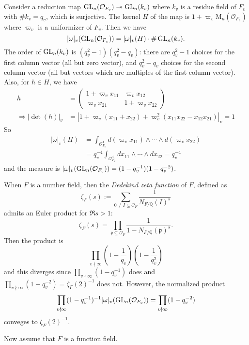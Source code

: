 \begin{problem} \notfinish
Consider a reduction map $\operatorname{\mathrm{GL}}_n(\mathcal{O}_{F_v}) \twoheadrightarrow \operatorname{\mathrm{GL}}_n(k_v)$ where $k_v$ is a residue field of $F_v$ with $\#k_v = q_v$,
which is surjective.
The kernel $H$ of the map is $1 + \varpi_v\mathrm{M}_{n}(\mathcal{O}_{F_v})$ where $\varpi_v$ is a uniformizer of $F_v$.
Then we have 
$$
|\omega|_v(\operatorname{\mathrm{GL}}_{n}(\mathcal{O}_{F_v})) = |\omega|_v(H) \cdot \# \operatorname{\mathrm{GL}}_{n}(k_v).
$$
The order of $\operatorname{\mathrm{GL}}_n(k_v)$ is $(q_v^2 - 1)(q_v^2 - q_v)$: there are $q_v^2 - 1$ choices for the first column vector (all but zero vector), and $q_v^2 - q_v$
choices for the second column vector (all but vectors which are multiples of the first column vector).
Also, for $h \in H$, we have
\begin{align*}
h &= \begin{pmatrix}
    1 + \varpi_v x_{11} & \varpi_v x_{12} \\ 
    \varpi_v x_{21} & 1 + \varpi_v x_{22}
\end{pmatrix}  \\
\Rightarrow |\det(h)|_v &= |1 + \varpi_v(x_{11} + x_{22}) + \varpi_v^{2} (x_{11}x_{22} - x_{12}x_{21})|_v = 1
\end{align*}
So
\begin{align*}
    |\omega|_v(H) &= \int_{\mathcal{O}_{F_v}^{4}} d(\varpi_v x_{11}) \wedge \cdots \wedge d(\varpi_v x_{22}) \\
    &= q_{v}^{-4}\int_{\mathcal{O}_{F_v}^{4}} dx_{11} \wedge \cdots \wedge dx_{22} = q_{v}^{-4}
\end{align*}
and the measure is $|\omega|_{v}(\operatorname{\mathrm{GL}}_n(\mathcal{O}_{F_v})) = (1 - q_{v}^{-1})(1 - q_{v}^{-2})$.

When $F$ is a number field, then the \emph{Dedekind zeta function} of $F$, defined as
$$
\zeta_F(s) := \sum_{0 \neq I \subseteq \mathcal{O}_F} \frac{1}{N_{F/\mathbb{Q}}(I)^{s}}
$$
admits an Euler product for $\Re s > 1$:
$$
\zeta_F(s) = \prod_{\mathfrak{p} \subseteq \mathcal{O}_{F}} \frac{1}{1 - N_{F/\mathbb{Q}}(\mathfrak{p})^{s}}.
$$
Then the product is 
$$
\prod_{v\nmid \infty} \left( 1 - \frac{1}{q_v}\right) \left(1 - \frac{1}{q_{v}^{2}}\right)
$$
and this diverges since $\prod_{v\nmid \infty} (1 - q_{v}^{-1})$ does and $\prod_{v\nmid \infty}(1 - q_{v}^{-2}) = \zeta_F(2)^{-1}$ does not.
However, the normalized product
$$
\prod_{v\nmid \infty} (1 - q_{v}^{-1})^{-1} |\omega|_{v}(\operatorname{\mathrm{GL}}_{n}(\mathcal{O}_{F_v})) = \prod_{v\nmid \infty} (1 - q_{v}^{-2})
$$
conveges to $\zeta_{F}(2)^{-1}$.

Now assume that $F$ is a function field.
\end{problem}

